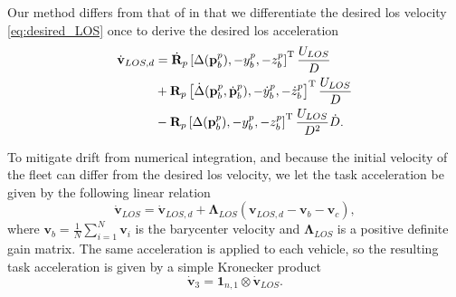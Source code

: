 Our method differs from that of \cite{matous_singularity-free_2022} in that we differentiate the desired \gls{los} velocity \eqref{eq:desired_LOS} once to derive the desired \gls{los} acceleration
\begin{equation}\label{eq:desired_LOS_derivative}
\begin{split}
        \dot{\mathbf{v}}_{LOS,d} &= \dot{\mathbf{R}}_p\left[ \Delta(\mathbf{p}_b^p), -y_b^p, -z_b^p \right]^{\rm T} \frac{U_{LOS}}{D} \\&+ \mathbf{R}_p \left[ \dot{\Delta}(\mathbf{p}_b^p, \dot{\mathbf{p}}_b^p), -\dot{y}_b^p, -\dot{z}_b^p \right]^{\rm T} \frac{U_{LOS}}{D}\\ &- \mathbf{R}_p \left[ \Delta(\mathbf{p}_b^p), -y_b^p, -z_b^p \right]^{\rm T} \frac{U_{LOS}}{D^2}\dot{D}.
    \end{split}
\end{equation}

To mitigate drift from numerical integration, and because the initial velocity of the fleet can differ from the desired \gls{los} velocity, we let the task acceleration be given by the following linear relation
\begin{equation} \label{eq:LOS_dynamics}
    \dot{\mathbf{v}}_{LOS} = \dot{\mathbf{v}}_{LOS,d} + \mathbf{\Lambda}_{LOS} (\mathbf{v}_{LOS,d} - \mathbf{v}_b-\mathbf{v}_c),
\end{equation}
where $\mathbf{v}_b = \tfrac{1}{N} \sum_{i=1}^N \mathbf{v}_i$ is the barycenter velocity and $\mathbf{\Lambda}_{LOS}$ is a positive definite gain matrix. The same acceleration is applied to each vehicle, so the resulting task acceleration is given by a simple Kronecker product
\begin{equation}
    \dot{\mathbf{v}}_3 = \mathbf{1}_{n,1} \otimes \dot{\mathbf{v}}_{LOS}.\label{eq:path_following_task_acceleration}
\end{equation}

